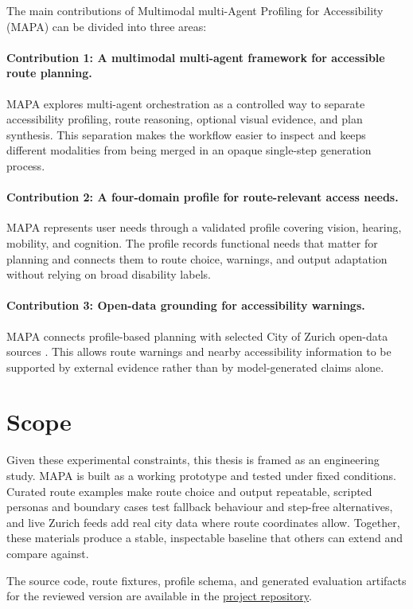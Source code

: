 \documentclass[../CLthesis.tex]{subfiles}
\begin{document}
The main contributions of Multimodal multi-Agent Profiling for Accessibility (MAPA) can be divided into three areas:
\paragraph{Contribution 1: A multimodal multi-agent framework for accessible route planning.}
MAPA explores multi-agent orchestration as a controlled way to separate accessibility profiling, route reasoning, optional visual evidence, and plan synthesis. This separation makes the workflow easier to inspect and keeps different modalities from being merged in an opaque single-step generation process.
\paragraph{Contribution 2: A four-domain profile for route-relevant access needs.}
MAPA represents user needs through a validated profile covering vision, hearing, mobility, and cognition. The profile records functional needs that matter for planning and connects them to route choice, warnings, and output adaptation without relying on broad disability labels.
\paragraph{Contribution 3: Open-data grounding for accessibility warnings.}
MAPA connects profile-based planning with selected City of Zurich open-data sources \citep{stadtzuerich_zueriact, stadtzuerich_zueriwc, stadtzuerich_parking}. This allows route warnings and nearby accessibility information to be supported by external evidence rather than by model-generated claims alone.


\section{Scope}
Given these experimental constraints, this thesis is framed as an engineering study. MAPA is built as a working prototype and tested under fixed conditions. Curated route examples make route choice and output repeatable, scripted personas and boundary cases test fallback behaviour and step-free alternatives, and live Zurich feeds add real city data where route coordinates allow. Together, these materials produce a stable, inspectable baseline that others can extend and compare against.

The source code, route fixtures, profile schema, and generated evaluation artifacts for the reviewed version are available in the \href{https://github.com/yyyuanfish/mapa-accessibility-profiler}{project repository}.
\end{document}
